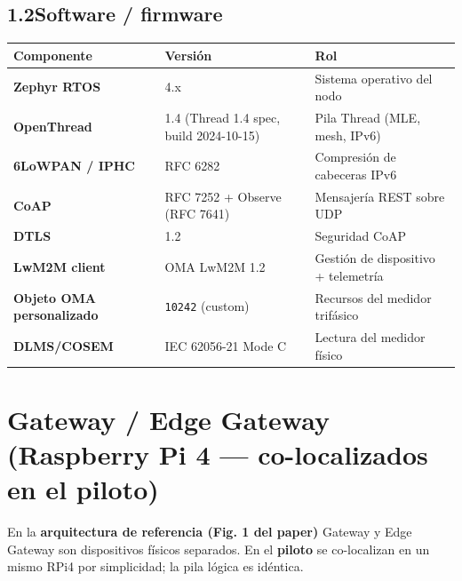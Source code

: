 \documentclass[11pt,a4paper]{article}
\newcommand{\tabhead}[1]{\textbf{\color{accentBlue!80!black}#1}}
\begin{document}
\subsection*{1.2\quad Software / firmware}
\noindent\begin{tabularx}{\linewidth}{L{3.6cm} L{4.2cm} Y}
\toprule
\tabhead{Componente} & \tabhead{Versión} & \tabhead{Rol} \\
\midrule
\textbf{Zephyr RTOS} & 4.x & Sistema operativo del nodo \\
\textbf{OpenThread} & 1.4 (Thread 1.4 spec, build 2024-10-15) & Pila Thread (MLE, mesh, IPv6) \\
\textbf{6LoWPAN / IPHC} & RFC 6282 & Compresión de cabeceras IPv6 \\
\textbf{CoAP} & RFC 7252 + Observe (RFC 7641) & Mensajería REST sobre UDP \\
\textbf{DTLS} & 1.2 & Seguridad CoAP \\
\textbf{LwM2M client} & OMA LwM2M 1.2 & Gestión de dispositivo + telemetría \\
\textbf{Objeto OMA personalizado} & \texttt{10242} (custom) & Recursos del medidor trifásico \\
\textbf{DLMS/COSEM} & IEC 62056-21 Mode C & Lectura del medidor físico \\
\bottomrule
\end{tabularx}

\section{Gateway / Edge Gateway (Raspberry Pi 4 — co-localizados en el piloto)}

\begin{notebox}
En la \textbf{arquitectura de referencia (Fig. 1 del paper)} Gateway y
Edge Gateway son dispositivos físicos separados. En el \textbf{piloto} se
co-localizan en un mismo RPi4 por simplicidad; la pila lógica es idéntica.
\end{notebox}
\end{document}
